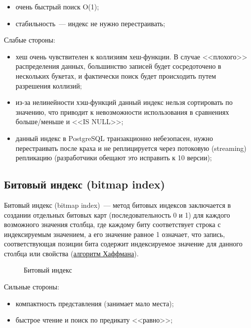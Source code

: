 \begin{itemize}
  \item очень быстрый поиск O(1);
  \item стабильность~--- индекс не нужно перестраивать;
\end{itemize}

Слабые стороны:

\begin{itemize}
  \item хеш очень чувствителен к коллизиям хеш-функции. В случае <<плохого>> распределения данных, большинство записей будет сосредоточено в нескольких букетах, и фактически поиск будет происходить путем разрешения коллизий;
  \item из-за нелинейности хэш-функций данный индекс нельзя сортировать по значению, что приводит к невозможности использования в сравнениях больше/меньше и <<IS NULL>>;
  \item данный индекс в PostgreSQL транзакционно небезопасен, нужно перестраивать после краха и не реплицируется через потоковую (streaming) репликацию (разработчики обещают это исправить к 10 версии);
\end{itemize}




\subsection{Битовый индекс (bitmap index)}
\label{sec:indexes-bitmap-index}

Битовый индекс (bitmap index)~--- метод битовых индексов заключается в создании отдельных битовых карт (последовательность 0 и 1) для каждого возможного значения столбца, где каждому биту соответствует строка с индексируемым значением, а его значение равное 1 означает, что запись, соответствующая позиции бита содержит индексируемое значение для данного столбца или свойства (\href{https://ru.wikipedia.org/wiki/%D0%9A%D0%BE%D0%B4_%D0%A5%D0%B0%D1%84%D1%84%D0%BC%D0%B0%D0%BD%D0%B0}{алгоритм Хаффмана}).

\begin{figure}[ht!]
  \caption{Битовый индекс}
  \label{fig:bitmap_index}
\end{figure}

Сильные стороны:

\begin{itemize}
  \item компактность представления (занимает мало места);
  \item быстрое чтение и поиск по предикату <<равно>>;
\end{itemize}

